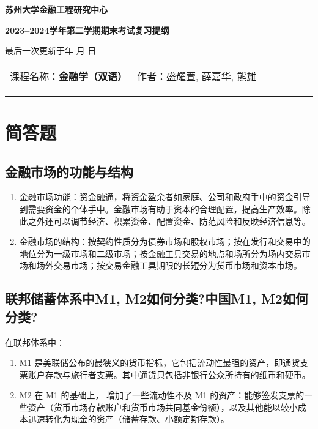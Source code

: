 \documentclass{article}
\renewcommand{\today}{\number\year 年 \number\month 月 \number\day 日}
\begin{document}
\vspace{1em}
\begin{center}
\textbf{\LARGE 苏州大学金融工程研究中心}\par
\vspace{8pt}
\textbf{\LARGE 2023--2024学年第二学期期末考试复习提纲}\par
\vspace{8pt}
最后一次更新于\today
\end{center}


\begin{center}
\begin{tabular}{m{} m{} m{}}
     课程名称：\textbf{金融学（双语）} 
     & \multicolumn{2}{l}{作者：盛耀萱, 薛嘉华, 熊雄}
\end{tabular}
\end{center}
\hrule height 1pt
\tableofcontents
\newpage
\section{简答题}

\subsection{金融市场的功能与结构}

\begin{enumerate}
    \item 金融市场功能：资金融通，将资金盈余者如家庭、公司和政府手中的资金引导到需要资金的个体手中。金融市场有助于资本的合理配置，提高生产效率。除此之外还可以调节经济、积累资金、配置资金、防范风险和反映经济信息等。
    \item 金融市场的结构：按契约性质分为债券市场和股权市场；按在发行和交易中的地位分为一级市场和二级市场；按金融工具交易的地点和场所分为场内交易市场和场外交易市场；按交易金融工具期限的长短分为货币市场和资本市场。
\end{enumerate}

\subsection{联邦储蓄体系中M1, M2如何分类?中国M1, M2如何分类?}

\noindent 在联邦体系中：
    \begin{enumerate}
    	\item M1 是美联储公布的最狭义的货币指标，它包括流动性最强的资产，即通货支票账户存款与旅行者支票。其中通货只包括非银行公众所持有的纸币和硬币。
    	\item M2 在 M1 的基础上， 增加了一些流动性不及 M1 的资产：能够签发支票的一些资产（货币市场存款账户和货币市场共同基金份额），以及其他能以较小成 本迅速转化为现金的资产（储蓄存款、小额定期存款）。
    \end{enumerate}
    
\end{document}
